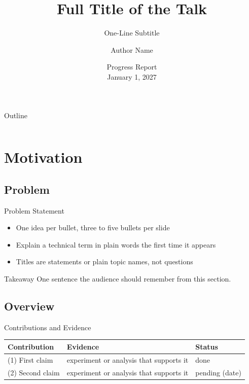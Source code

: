 \documentclass[aspectratio=169,10pt]{beamer}
\title[Short Title]{Full Title of the Talk}
\subtitle{One-Line Subtitle}
\author[A.~Author]{Author Name}
\institute[Univ.]{Institution}
\date[Jan 1, 2027]{Progress Report\\[4pt] January 1, 2027}
\newcommand{\ok}{\textcolor{green!50!black}{done}}
\newcommand{\pend}{\textcolor{orange!80!black}{pending}}
\newenvironment{takeaway}{\begin{exampleblock}{Takeaway}}{\end{exampleblock}}   %
\begin{document}
\begin{frame}
  \titlepage
\end{frame}

{
\begin{frame}{Outline}
  \begin{columns}[T]
    \begin{column}{0.48\textwidth}
      \tableofcontents[sections={1-2}]
    \end{column}
    \begin{column}{0.48\textwidth}
      \tableofcontents[sections={3-4}]
    \end{column}
  \end{columns}
\end{frame}
}

\section{Motivation}

\subsection{Problem}
\begin{frame}{Problem Statement}
  \begin{itemize}
    \item One idea per bullet, three to five bullets per slide
    \item Explain a technical term in plain words the first time it appears
    \item Titles are statements or plain topic names, not questions
  \end{itemize}
  \begin{takeaway}
    One sentence the audience should remember from this section.
  \end{takeaway}
\end{frame}

\subsection{Overview}
\begin{frame}{Contributions and Evidence}
  \centering\small
  \begin{tabular}{@{}L{0.32\textwidth}L{0.44\textwidth}L{0.17\textwidth}@{}}
    \toprule
    Contribution & Evidence & Status \\
    \midrule
    \addlinespace (1) First claim & experiment or analysis that supports it & \ok \\
    \addlinespace (2) Second claim & experiment or analysis that supports it & \pend{} (date) \\
    \bottomrule
  \end{tabular}
\end{frame}
\end{document}
